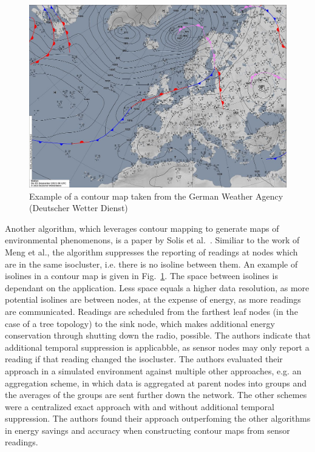 \begin{figure}[h]
\includegraphics[width=\linewidth]{images/contour-map.jpg}
\caption{Example of a contour map taken from the German Weather Agency (Deutscher Wetter Dienst)~\cite{dwd}}
\label{fig:contour map}
\centering
\end{figure}

Another algorithm, which leverages contour mapping to generate maps of
environmental phenomenons, is a paper by Solis et
al.~\cite{solis2005efficient}. Similiar to the work of Meng et al., the
algorithm suppresses the reporting of readings at nodes which are in the same
isocluster, i.e. there is no isoline between them. An example of isolines in a
contour map is given in Fig.~\ref{fig:contour map}. The space between isolines
is dependant on the application. Less space equals a higher data resolution, as
more potential isolines are between nodes, at the expense of energy, as more
readings are communicated. Readings are scheduled from the farthest leaf nodes
(in the case of a tree topology) to the sink node, which makes additional
energy conservation through shutting down the radio, possible. The authors
indicate that additional temporal suppression is applicabble, as sensor nodes
may only report a reading if that reading changed the isocluster. The authors
evaluated their approach in a simulated environment against multiple other
approaches, e.g. an aggregation scheme, in which data is aggregated at parent
nodes into groups and the averages of the groups are sent further down the
network. The other schemes were a centralized exact approach with and without
additional temporal suppression. The authors found their approach outperfoming
the other algorithms in energy savings and accuracy when constructing contour
maps from sensor readings.

